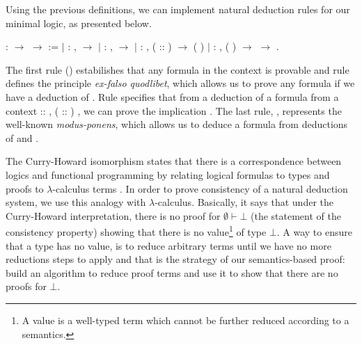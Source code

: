 Using the previous definitions, we can implement natural deduction rules for our minimal logic, as presented below.
\begin{coqdoccode}
\coqdocemptyline
\coqdocemptyline
\coqdocnoindent
{}  : \coqdocvar{$\Gamma$} \ensuremath{\rightarrow} \coqdocvar{$\alpha$} \ensuremath{\rightarrow}  :=\coqdoceol
\coqdocnoindent
\ensuremath{|}  : \coqdockw{\ensuremath{\forall}}  ,    \ensuremath{\rightarrow}   \coqdoceol
\coqdocnoindent
\ensuremath{|}  : \coqdockw{\ensuremath{\forall}}  ,    \ensuremath{\rightarrow}   \coqdoceol
\coqdocnoindent
\ensuremath{|}  : \coqdockw{\ensuremath{\forall}}   ,  ( :: )  \ensuremath{\rightarrow}   (  )\coqdoceol
\coqdocnoindent
\ensuremath{|}  : \coqdockw{\ensuremath{\forall}}   ,   (  ) \ensuremath{\rightarrow}    \ensuremath{\rightarrow}   .\coqdoceol
\coqdocemptyline
\end{coqdoccode}
The first rule () estabilishes that any formula in the context is provable and rule  defines
the principle \emph{ex-falso quodlibet}, which allows us to prove any formula if we have a deduction of .
Rule  specifies that from a deduction of a formula  from a context  :: ,  ( :: ) ,
we can prove the implication   . The last rule, , represents the well-known \emph{modus-ponens},
which allows us to deduce a formula  from deductions of    and .


The Curry-Howard isomorphism states that there is a correspondence between logics and functional programming by
relating logical formulas to types and proofs to $\lambda$-calculus terms \cite{Sorensen06}. In order to prove
consistency of a natural deduction system, we use this analogy with $\lambda$-calculus. Basically, it says that under the
Curry-Howard interpretation, there is no proof for $\emptyset \vdash \bot$
(the statement of the consistency property) showing that there is no value\footnote{A value is a well-typed term
which cannot be further reduced according to a semantics.} of type $\bot$. A way to ensure that a type
has no value, is to reduce arbitrary terms until we have no more reductions steps to apply and that is the strategy of our
semantics-based proof: build an algorithm to reduce proof terms and use it to show that there are no proofs
for $\bot$.



